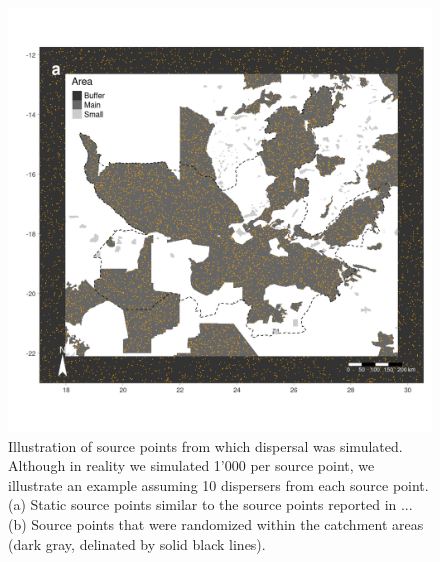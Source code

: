 \documentclass[abstract=on,10pt,a4paper,bibliography=totocnumbered]{article}
\begin{document}

\begin{figure}[htbp]
  \begin{center}
    \includegraphics[width = \textwidth]{99_SourcePoints.png}
    \caption{Illustration of source points from which dispersal was simulated.
    Although in reality we simulated 1'000 per source point, we illustrate an
    example assuming 10 dispersers from each source point. (a) Static source
    points similar to the source points reported in ... (b) Source points that
    were randomized within the catchment areas (dark gray, delinated by solid
    black lines).}
    \label{SourcePoints}
  \end{center}
\end{figure}
\end{document}
